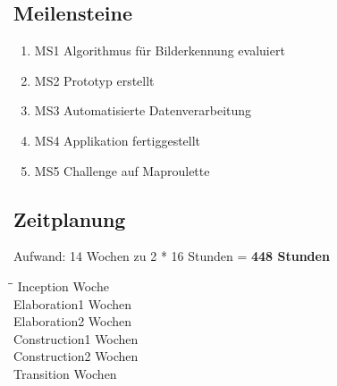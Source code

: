 \subsection{Meilensteine}
\begin{enumerate}
	\item MS1 Algorithmus für Bilderkennung evaluiert
	\item MS2 Prototyp erstellt
	\item MS3 Automatisierte Datenverarbeitung
	\item MS4 Applikation fertiggestellt
	\item MS5 Challenge auf Maproulette
\end{enumerate}

\subsection{Zeitplanung}
Aufwand: 14 Wochen zu 2 * 16 Stunden = \textbf{448 Stunden}
\begin{tabbing}[H]
    \hspace*{6cm}\=\hspace*{6cm}\= \kill
    Inception  Woche \\
	Elaboration1  Wochen \\
	Elaboration2  Wochen \\
	Construction1  Wochen \\
	Construction2  Wochen \\
	Transition  Wochen \\
\end{tabbing}


